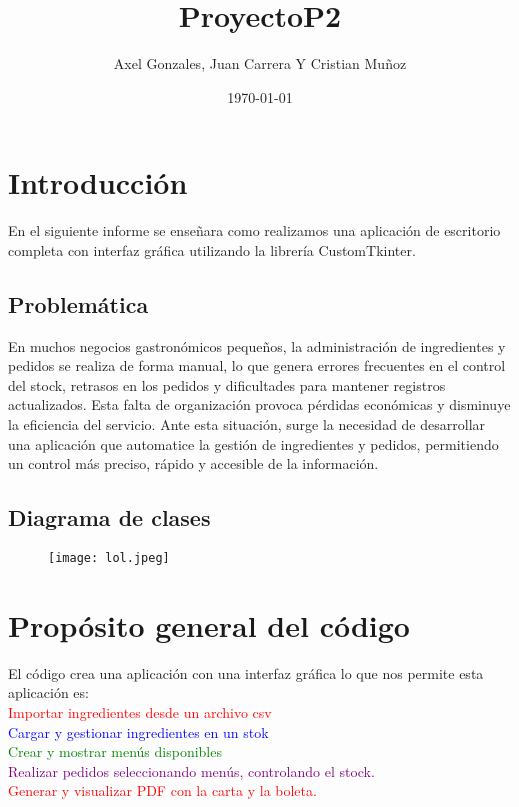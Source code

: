 \documentclass{article}
\title{ProyectoP2}
\author{Axel Gonzales, Juan Carrera Y Cristian Muñoz}
\date{\today}
\begin{document}
\maketitle
\section{Introducción}
En el siguiente informe se enseñara como realizamos una aplicación de escritorio completa con interfaz gráfica utilizando la librería CustomTkinter.
\subsection{Problemática}
En muchos negocios gastronómicos pequeños, la administración de ingredientes y pedidos se realiza de forma manual, lo que genera errores frecuentes en el control del stock, retrasos en los pedidos y dificultades para mantener registros actualizados.
Esta falta de organización provoca pérdidas económicas y disminuye la eficiencia del servicio.
Ante esta situación, surge la necesidad de desarrollar una aplicación que automatice la gestión de ingredientes y pedidos, permitiendo un control más preciso, rápido y accesible de la información.
\subsection{Diagrama de clases}
\vspace{-0,5cm} %
\begin{figure}[H]
    \centering
    \texttt{[image: lol.jpeg]}
    \label{fig:placeholder}
\end{figure}
\section{Propósito general del código}
El código crea una aplicación con una interfaz gráfica lo que nos permite esta aplicación es:\\
\textcolor{red}{Importar ingredientes desde un archivo csv}\\
\textcolor{blue}{Cargar y gestionar ingredientes en un stok}\\
\textcolor{green}{Crear y mostrar menús disponibles}\\
\textcolor{purple}{Realizar pedidos seleccionando menús, controlando el stock.}\\
\textcolor{red}{Generar y visualizar PDF con la carta y la boleta.}\\
\end{document}
